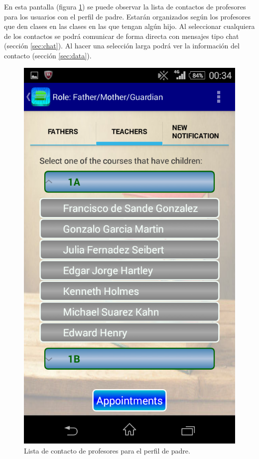 			En esta pantalla (figura \ref{fig:padreProfe}) se puede observar la lista de contactos de profesores para los usuarios con el perfil de padre. Estarán organizados según los profesores que den clases en las clases en las que tengan algún hijo. Al seleccionar cualquiera de los contactos se podrá comunicar de forma directa con mensajes tipo chat (sección \ref{sec:chat}). Al hacer una selección larga podrá ver la información del contacto (sección \ref{sec:data}).
		
			\begin{figure}[h !]
				\centering
				\includegraphics[scale=0.2]{Imagenes/App/padreProfe}
				\caption{Lista de contacto de profesores para el perfil de padre.}
				\label{fig:padreProfe}
			\end{figure}
		
